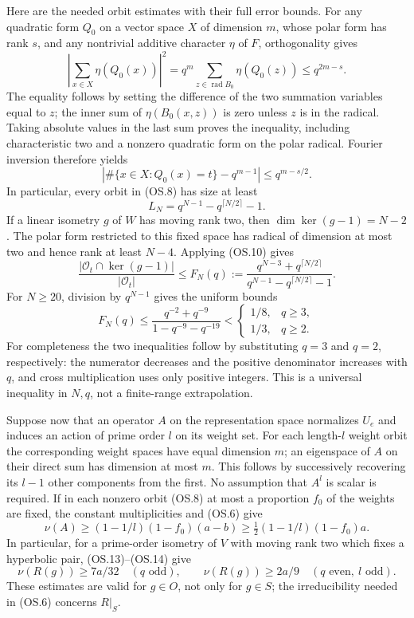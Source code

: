 Here are the needed orbit estimates with their full error bounds.
For any quadratic form $Q_0$ on a vector space $X$ of dimension $m$,
whose polar form has rank $s$, and any nontrivial additive character
$\eta$ of $F$, orthogonality gives
\[
 \left|\sum_{x\in X}\eta(Q_0(x))\right|^2
 =q^m\sum_{z\in\operatorname{rad}B_0}\eta(Q_0(z))
 \le q^{2m-s}.
 \tag{OS.9}
\]
The equality follows by setting the difference of the two summation
variables equal to $z$; the inner sum of $\eta(B_0(x,z))$ is zero
unless $z$ is in the radical.  Taking absolute values in the last
sum proves the inequality, including characteristic two and a
nonzero quadratic form on the polar radical.  Fourier inversion
therefore yields
\[
 \left|\#\{x\in X:Q_0(x)=t\}-q^{m-1}\right|
 \le q^{m-s/2}.
 \tag{OS.10}
\]
In particular, every orbit in (OS.8) has size at least
\[
                  L_N=q^{N-1}-q^{\lceil N/2\rceil}-1.
 \tag{OS.11}
\]
If a linear isometry $g$ of $W$ has moving rank two, then
$\dim\ker(g-1)=N-2$.  The polar form restricted to this fixed space
has radical of dimension at most two and hence rank at least $N-4$.
Applying (OS.10) gives
\[
 \frac{|\mathcal O_t\cap\ker(g-1)|}{|\mathcal O_t|}
 \le F_N(q):=
 \frac{q^{N-3}+q^{\lceil N/2\rceil}}
      {q^{N-1}-q^{\lceil N/2\rceil}-1}.
 \tag{OS.12}
\]
For $N\ge20$, division by $q^{N-1}$ gives the uniform bounds
\[
 F_N(q)\le\frac{q^{-2}+q^{-9}}{1-q^{-9}-q^{-19}}
 <\begin{cases}1/8,&q\ge3,\\1/3,&q\ge2.\end{cases}
 \tag{OS.13}
\]
For completeness the two inequalities follow by substituting
$q=3$ and $q=2$, respectively: the numerator decreases and the
positive denominator increases with $q$, and cross multiplication
uses only positive integers.  This is a universal inequality in
$N,q$, not a finite-range extrapolation.

Suppose now that an operator $A$ on the representation space
normalizes $U_e$ and induces an action of prime order $l$ on its
weight set.  For each length-$l$ weight orbit the corresponding
weight spaces have equal dimension $m$; an eigenspace of $A$ on
their direct sum has dimension at most $m$.  This follows by
successively recovering its $l-1$ other components from the first.
No assumption that $A^l$ is scalar is required.  If in each nonzero
orbit (OS.8) at most a proportion $f_0$ of the weights are fixed,
the constant multiplicities and (OS.6) give
\[
                \nu(A)\ge (1-1/l)(1-f_0)(a-b)
                         \ge\tfrac12(1-1/l)(1-f_0)a.
 \tag{OS.14}
\]
In particular, for a prime-order isometry of $V$ with moving rank
two which fixes a hyperbolic pair, (OS.13)--(OS.14) give
\[
 \nu(R(g))\ge7a/32\quad(q\text{ odd}),\qquad
 \nu(R(g))\ge2a/9\quad(q\text{ even},\ l\text{ odd}).
 \tag{OS.15}
\]
These estimates are valid for $g\in O$, not only for $g\in S$;
the irreducibility needed in (OS.6) concerns $R|_S$.


